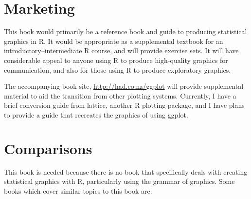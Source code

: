 \documentclass[oneside,letterpaper]{scrartcl}
\begin{document}
\section{Marketing}\label{sec:marketing} 


This book would primarily be a reference book and guide to producing statistical graphics in R.  It would be appropriate as a supplemental textbook for an introductory--intermediate R course, and will provide exercise sets.  It will have considerable appeal to anyone using R to produce high-quality graphics for communication, and also for those using R to produce exploratory graphics.  

The accompanying book site, \url{http://had.co.nz/ggplot} will provide supplemental material to aid the transition from other plotting systems.  Currently, I have a brief conversion guide from lattice, another R plotting package, and I have plans to provide a guide that recreates the graphics of \citet{wilkinson:2006} using ggplot.

\section{Comparisons}\label{sec:comparisons} 


This book is needed because there is no book that specifically deals with creating statistical graphics with R, particularly using the grammar of graphics.  Some books which cover similar topics to this book are:
\end{document}
